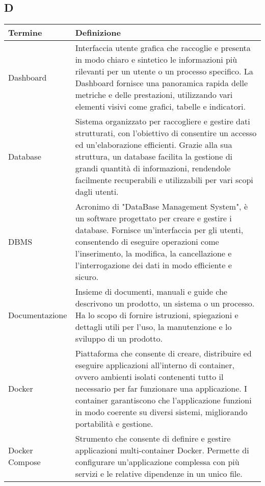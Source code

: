 \documentclass[10pt]{article}
\begin{document}
\subsection{D} %
\begin{longtable}{|>{\centering\arraybackslash}m{2.5cm}|>{\arraybackslash}m{12.5cm}|}
\hline
\rowcolor[gray]{0.8}
\textbf{Termine} & \textbf{Definizione}\\
\endhead
\hline
Dashboard & Interfaccia utente grafica che raccoglie e presenta in modo chiaro e sintetico le informazioni più rilevanti per un utente o un processo specifico. La Dashboard fornisce una panoramica rapida delle metriche e delle prestazioni, utilizzando vari elementi visivi come grafici, tabelle e indicatori.\\
\hline
Database & Sistema organizzato per raccogliere e gestire dati strutturati, con l'obiettivo di consentire un accesso ed un'elaborazione efficienti. Grazie alla sua struttura, un database facilita la gestione di grandi quantità di informazioni, rendendole facilmente recuperabili e utilizzabili per vari scopi dagli utenti.\\
\hline
DBMS & Acronimo di "DataBase Management System", è un software progettato per creare e gestire i database. Fornisce un'interfaccia per gli utenti, consentendo di eseguire operazioni come l'inserimento, la modifica, la cancellazione e l'interrogazione dei dati in modo efficiente e sicuro.\\
\hline
Documentazione & Insieme di documenti, manuali e guide che descrivono un prodotto, un sistema o un processo. Ha lo scopo di fornire istruzioni, spiegazioni e dettagli utili per l'uso, la manutenzione e lo sviluppo di un prodotto.\\
\hline
Docker & Piattaforma che consente di creare, distribuire ed eseguire applicazioni all'interno di container, ovvero ambienti isolati contenenti tutto il necessario per far funzionare una applicazione. I container garantiscono che l'applicazione funzioni in modo coerente su diversi sistemi, migliorando portabilità e gestione.\\
\hline
Docker Compose & Strumento che consente di definire e gestire applicazioni multi-container Docker. Permette di configurare un'applicazione complessa con più servizi e le relative dipendenze in un unico file.\\
\hline
\end{longtable}
\end{document}
